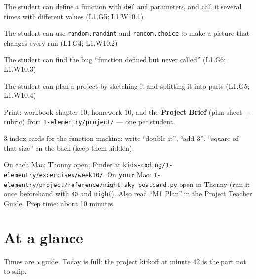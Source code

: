 
\begin{objectives}
  \item The student can define a function with \texttt{def} and parameters, and call it several times with different values (L1.G5; L1.W10.1)
  \item The student can use \texttt{random.randint} and \texttt{random.choice} to make a picture that changes every run (L1.G4; L1.W10.2)
  \item The student can find the bug \enquote{function defined but never called} (L1.G6; L1.W10.3)
  \item The student can plan a project by sketching it and splitting it into parts (L1.G5; L1.W10.4)
\end{objectives}

\begin{materials}
  \item Print: workbook chapter 10, homework 10, and the \textbf{Project Brief} (plan sheet + rubric) from \texttt{1-elementry/project/} --- one per student.
  \item 3 index cards for the function machine: write \enquote{double it}, \enquote{add 3}, \enquote{square of that size} on the back (keep them hidden).
  \item On each Mac: Thonny open; Finder at \texttt{kids-coding/1-elementry/excercises/week10/}. On \textbf{your} Mac: \texttt{1-elementry/project/reference/night\_sky\_postcard.py} open in Thonny (run it once beforehand with \texttt{40} and \texttt{night}). Also read \enquote{M1 Plan} in the Project Teacher Guide. Prep time: about 10 minutes.
\end{materials}

\section{At a glance}
Times are a guide. Today is full: the project kickoff at minute 42 is the part not to skip.
\begin{timeplan}
\end{timeplan}

